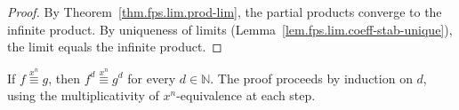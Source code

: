\begin{proof}
\leanok
By Theorem~\ref{thm.fps.lim.prod-lim}, the partial products converge to
the infinite product. By uniqueness of limits
(Lemma~\ref{lem.fps.lim.coeff-stab-unique}), the limit equals the
infinite product.
\end{proof}

\begin{lemma}
\label{lem.fps.lim.xnEquiv-pow}
\leanhelper
\leanok
If $f \overset{x^n}{\equiv} g$, then $f^d \overset{x^n}{\equiv} g^d$
for every $d \in \mathbb{N}$. The proof proceeds by induction on $d$,
using the multiplicativity of $x^n$-equivalence at each step.
\end{lemma}
